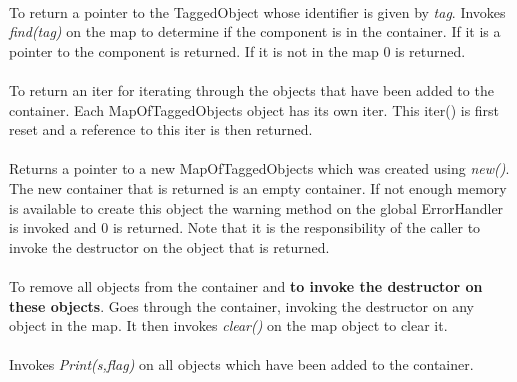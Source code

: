 \\
To return a pointer to the TaggedObject whose identifier is given by
{\em tag}. Invokes {\em find(tag)} on the map to determine if the
component is in the container. If it is a pointer to the component is
returned. If it is not in the map $0$ is returned. \\

\\
To return an iter for iterating through the objects that have been
added to the container. Each MapOfTaggedObjects object has its own iter. This
iter() is first reset and a reference to this iter is then returned.\\ 

\\
Returns a pointer to a new MapOfTaggedObjects which was created using
{\em new()}. The new container that is returned is an empty container.
If not enough memory is available to create this object the warning
method on the global ErrorHandler is invoked and $0$ is returned.
Note that it is the responsibility of the caller to invoke the destructor on the
object that is returned. \\


\\
To remove all objects from the container and {\bf to invoke the
destructor on these objects}. Goes through the container, invoking the
destructor on any object in the map. It then invokes {\em clear()} on
the map object to clear it. \\

\\
Invokes {\em Print(s,flag)} on all objects which have been added to
the container. 






